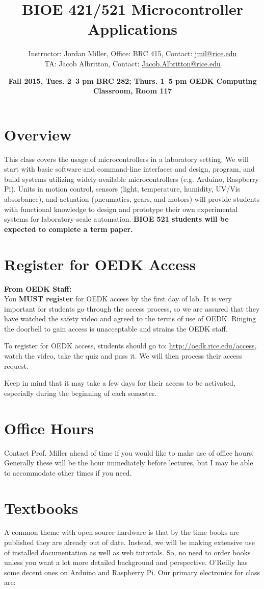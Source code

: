 \documentclass[10pt]{article}
\title{\textbf{BIOE 421/521 Microcontroller Applications}}
\date{\textbf{Fall 2015, Tues. 2--3 pm BRC 282; Thurs. 1--5 pm OEDK Computing Classroom, Room 117}}                                           %
\author{Instructor: Jordan Miller, Office: BRC 415, Contact: \href{mailto:jmil@rice.edu}{jmil@rice.edu} \\ TA: Jacob Albritton, Contact: \href{mailto:Jacob.Albritton@rice.edu}{Jacob.Albritton@rice.edu}}
\begin{document}
\maketitle

\section*{Overview}
This class covers the usage of microcontrollers in a laboratory setting. We will start with basic software and command-line interfaces and design, program, and build systems utilizing widely-available microcontrollers (e.g. Arduino, Raspberry Pi). Units in motion control, sensors (light, temperature, humidity, UV/Vis absorbance), and actuation (pneumatics, gears, and motors) will provide students with functional knowledge to design and prototype their own experimental systems for laboratory-scale automation. \textbf{BIOE 521 students will be expected to complete a term paper.}

\section*{Register for OEDK Access}
\textbf{From OEDK Staff:}\\
You \textbf{MUST register} for OEDK access by the first day of lab. It is very important for students go through the access process, so we are assured that they have watched the safety video and agreed to the terms of use of OEDK. Ringing the doorbell to gain access is unacceptable and strains the OEDK staff.  

To register for OEDK access, students should go to: \href{http://oedk.rice.edu/access}{http://oedk.rice.edu/access}, watch the video, take the quiz and pass it. We will then process their access request.

Keep in mind that it may take a few days for their access to be activated, especially during the beginning of each semester.

\section*{Office Hours}
Contact Prof. Miller ahead of time if you would like to make use of office hours. Generally these will be the hour immediately before lectures, but I may be able to accommodate other times if you need.

\section*{Textbooks}
A common theme with open source hardware is that by the time books are published they are already out of date. Instead, we will be making extensive use of installed documentation as well as web tutorials. So, no need to order books unless you want a lot more detailed background and perspective. O'Reilly has some decent ones on Arduino and Raspberry Pi. Our primary electronics for class are:
\end{document}
